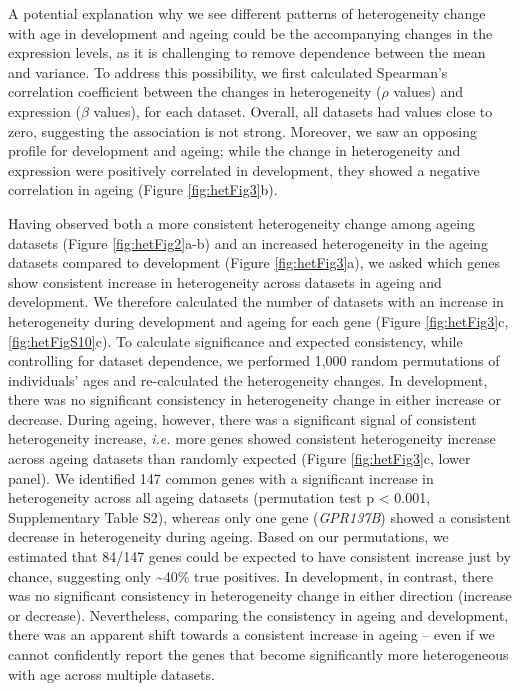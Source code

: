 \documentclass[12pt,twoside]{unicam}
\begin{document}
A potential explanation why we see different patterns of heterogeneity change with age in development and ageing could be the accompanying changes in the expression levels, as it is challenging to remove dependence between the mean and variance. To address this possibility, we first calculated Spearman's correlation coefficient between the changes in heterogeneity (\(\rho\) values) and expression (\(\beta\) values), for each dataset. Overall, all datasets had values close to zero, suggesting the association is not strong. Moreover, we saw an opposing profile for development and ageing; while the change in heterogeneity and expression were positively correlated in development, they showed a negative correlation in ageing (Figure \ref{fig:hetFig3}b).

Having observed both a more consistent heterogeneity change among ageing datasets (Figure \ref{fig:hetFig2}a-b) and an increased heterogeneity in the ageing datasets compared to development (Figure \ref{fig:hetFig3}a), we asked which genes show consistent increase in heterogeneity across datasets in ageing and development. We therefore calculated the number of datasets with an increase in heterogeneity during development and ageing for each gene (Figure \ref{fig:hetFig3}c, \ref{fig:hetFigS10}c). To calculate significance and expected consistency, while controlling for dataset dependence, we performed 1,000 random permutations of individuals' ages and re-calculated the heterogeneity changes. In development, there was no significant consistency in heterogeneity change in either increase or decrease. During ageing, however, there was a significant signal of consistent heterogeneity increase, \emph{i.e.} more genes showed consistent heterogeneity increase across ageing datasets than randomly expected (Figure \ref{fig:hetFig3}c, lower panel). We identified 147 common genes with a significant increase in heterogeneity across all ageing datasets (permutation test p \textless{} 0.001, Supplementary Table S2), whereas only one gene (\emph{GPR137B}) showed a consistent decrease in heterogeneity during ageing. Based on our permutations, we estimated that 84/147 genes could be expected to have consistent increase just by chance, suggesting only \textasciitilde40\% true positives. In development, in contrast, there was no significant consistency in heterogeneity change in either direction (increase or decrease). Nevertheless, comparing the consistency in ageing and development, there was an apparent shift towards a consistent increase in ageing -- even if we cannot confidently report the genes that become significantly more heterogeneous with age across multiple datasets.
\end{document}
